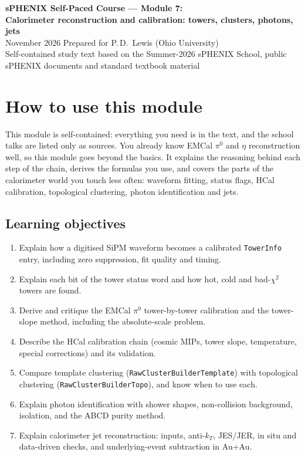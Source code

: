 \documentclass[11pt,letterpaper]{article}
\begin{document}
\begin{center}
{\LARGE\bfseries sPHENIX Self-Paced Course --- Module 7:}\\[4pt]
{\Large\bfseries Calorimeter reconstruction and calibration: towers, clusters, photons, jets}\\[8pt]
November 2026 \quad Prepared for P.\,D.\ Lewis (Ohio University)\\[2pt]
\small Self-contained study text based on the Summer-2026 sPHENIX School, public sPHENIX documents and standard textbook material
\end{center}

\tableofcontents
\newpage

\section*{How to use this module}
This module is self-contained: everything you need is in the text, and the school talks are listed only as sources.
You already know EMCal $\pi^0$ and $\eta$ reconstruction well, so this module goes beyond the basics.
It explains the reasoning behind each step of the chain, derives the formulas you use, and covers the parts of the calorimeter world you touch less often:
waveform fitting, status flags, HCal calibration, topological clustering, photon identification and jets.

\subsection*{Learning objectives}
\begin{enumerate}[label=O\arabic*.]
\item Explain how a digitised SiPM waveform becomes a calibrated \texttt{TowerInfo} entry, including zero suppression, fit quality and timing.
\item Explain each bit of the tower status word and how hot, cold and bad-$\chi^2$ towers are found.
\item Derive and critique the EMCal $\pi^0$ tower-by-tower calibration and the tower-slope method, including the absolute-scale problem.
\item Describe the HCal calibration chain (cosmic MIPs, tower slope, temperature, special corrections) and its validation.
\item Compare template clustering (\texttt{RawClusterBuilderTemplate}) with topological clustering (\texttt{RawClusterBuilderTopo}), and know when to use each.
\item Explain photon identification with shower shapes, non-collision background, isolation, and the ABCD purity method.
\item Explain calorimeter jet reconstruction: inputs, anti-$k_T$, JES/JER, in situ and data-driven checks, and underlying-event subtraction in Au+Au.
\end{enumerate}
\end{document}
